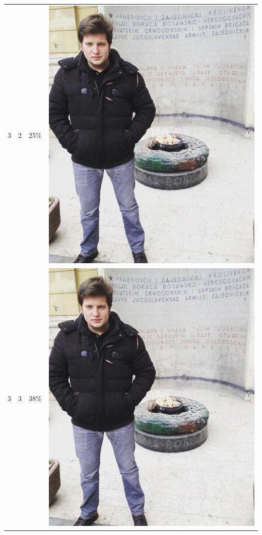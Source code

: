 \documentclass[times, utf8, seminar]{fer}
\begin{document}
\begin{center}
\begin{longtable}{|c|c|c|c|}
3 & 2 &25\% & \includegraphics[scale=0.3]{../benchmark_results/pattern/3_components-2_bits.png} \\
3 & 3 &38\% & \includegraphics[scale=0.3]{../benchmark_results/pattern/3_components-3_bits.png} \\

\end{longtable}
\end{center}
\end{document}
